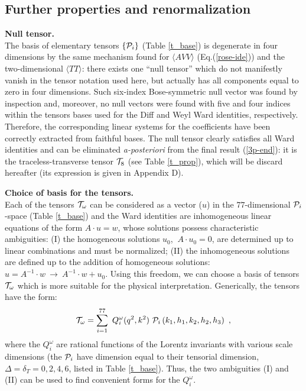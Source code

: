 \documentclass[11pt]{article}
\newcommand{\beq}{\begin{equation}}
\newcommand{\eeq}{\end{equation}}
\def\o{\omega}
\def\bra{\langle}
\def\ket{\rangle}
\def\dt{{\delta_T}} %
\begin{document}
 

\subsection{Further properties and renormalization} 

{\bf Null tensor.}\\
The basis of elementary tensors $\{ {\cal P}_i\}$ (Table \ref{t_base}) 
is degenerate in four dimensions by the same mechanism found for
$\bra AVV\ket$ (Eq.(\ref{rose-ide})) and the two-dimensional
$\bra TT\ket$: 
there exists one ``null tensor'' which do not manifestly vanish in 
the tensor notation used here, but actually has all
components equal to zero in four dimensions.
Such six-index Bose-symmetric null vector 
was found by inspection and, moreover, 
no null vectors were found with five and four indices
within the tensors bases used for the Diff and Weyl Ward identities,
respectively.
Therefore, the corresponding linear systems for the coefficients
have been correctly extracted from faithful bases. 
The null tensor clearly satisfies all Ward identities and can be eliminated
{\it a-posteriori} from the final result (\ref{3p-end}):
it is the traceless-transverse tensor ${\cal T}_8$
(see Table \ref{t_prop}), which will be discard hereafter
(its expression is given in Appendix D).

\bigskip

\noindent
{\bf Choice of basis for the tensors.}\\
Each of the tensors ${\cal T}_\omega$ can be considered as a 
vector ($u$) in the 
$77$-dimensional ${\cal P}_i$-space (Table \ref{t_base}) and the
Ward identities are inhomogeneous linear equations
of the form $A\cdot u=w$, whose solutions possess characteristic
ambiguities:
(I) the homogeneous solutions $u_0$, $\ A\cdot u_0=0$, are determined 
up to linear combinations and must be normalized;
(II) the inhomogeneous solutions are defined up to
the addition of homogeneous solutions: 
$u=A^{-1}\cdot w \ \to \ A^{-1}\cdot w +u_0$.
Using this freedom, we can choose a basis of tensors
${\cal T}_\omega$ which is more suitable for the physical interpretation.
Generically, the tensors have the form:
\beq
{\cal T}_\omega = \sum_{i=1}^{77} \ Q_i^\o(q^2,k^2) 
\ {\cal P}_i \left(k_1,h_1,k_2,h_2,h_3\right)\ ,
\label{polyform}
\eeq
where the $Q_i^\o$ are rational functions of the Lorentz invariants
with various scale dimensions (the ${\cal P}_i$ have dimension equal
to their tensorial dimension, $\Delta=\dt =0,2,4,6$, listed in Table
\ref{t_base}). Thus, the two ambiguities (I) and (II)
can be used to find convenient forms for the $Q_i^\o$.
\end{document}
